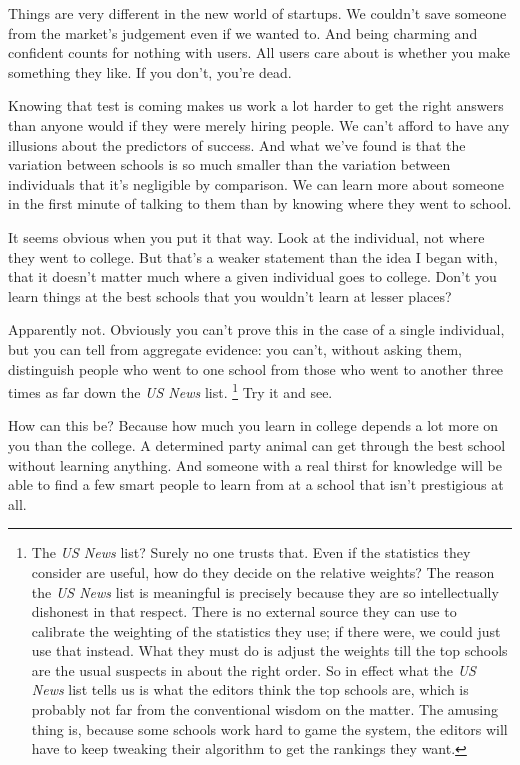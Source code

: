 \documentclass[12pt]{book}
\begin{document}
Things are very different in the new world of startups. We couldn't save
someone from the market's judgement even if we wanted to. And being
charming and confident counts for nothing with users. All users care
about is whether you make something they like. If you don't, you're
dead.

Knowing that test is coming makes us work a lot harder to get the right
answers than anyone would if they were merely hiring people. We can't
afford to have any illusions about the predictors of success. And what
we've found is that the variation between schools is so much smaller
than the variation between individuals that it's negligible by
comparison. We can learn more about someone in the first minute of
talking to them than by knowing where they went to school.

It seems obvious when you put it that way. Look at the individual, not
where they went to college. But that's a weaker statement than the idea
I began with, that it doesn't matter much where a given individual goes
to college. Don't you learn things at the best schools that you wouldn't
learn at lesser places?

Apparently not. Obviously you can't prove this in the case of a single
individual, but you can tell from aggregate evidence: you can't, without
asking them, distinguish people who went to one school from those who
went to another three times as far down the \emph{US News} list.
\footnote{The \emph{US News} list? Surely no one trusts that. Even if the
statistics they consider are useful, how do they decide on the relative
weights? The reason the \emph{US News} list is meaningful is precisely
because they are so intellectually dishonest in that respect. There is
no external source they can use to calibrate the weighting of the
statistics they use; if there were, we could just use that instead. What
they must do is adjust the weights till the top schools are the usual
suspects in about the right order. So in effect what the \emph{US News}
list tells us is what the editors think the top schools are, which is
probably not far from the conventional wisdom on the matter. The amusing
thing is, because some schools work hard to game the system, the editors
will have to keep tweaking their algorithm to get the rankings they
want.} Try it and see.

How can this be? Because how much you learn in college depends a lot
more on you than the college. A determined party animal can get through
the best school without learning anything. And someone with a real
thirst for knowledge will be able to find a few smart people to learn
from at a school that isn't prestigious at all.
\end{document}
